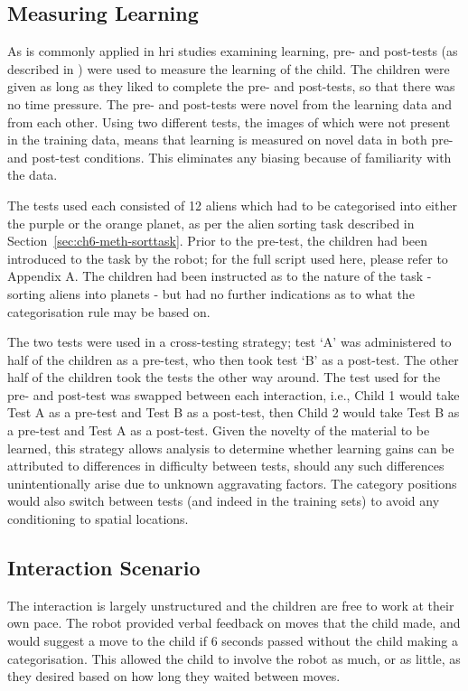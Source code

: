 \subsection{Measuring Learning}\label{sec:ch6-measure-learn}
As is commonly applied in \acrshort{hri} studies examining learning, pre- and post-tests (as described in \citealp{dimitrov2003pretest}) were used to measure the learning of the child. The children were given as long as they liked to complete the pre- and post-tests, so that there was no time pressure. The pre- and post-tests were novel from the learning data and from each other. Using two different tests, the images of which were not present in the training data, means that learning is measured on novel data in both pre- and post-test conditions. This eliminates any biasing because of familiarity with the data.

The tests used each consisted of 12 aliens which had to be categorised into either the purple or the orange planet, as per the alien sorting task described in Section~\ref{sec:ch6-meth-sorttask}. Prior to the pre-test, the children had been introduced to the task by the robot; for the full script used here, please refer to Appendix A. The children had been instructed as to the nature of the task - sorting aliens into planets - but had no further indications as to what the categorisation rule may be based on.

The two tests were used in a cross-testing strategy; test `A' was administered to half of the children as a pre-test, who then took test `B' as a post-test. The other half of the children took the tests the other way around. The test used for the pre- and post-test was swapped between each interaction, i.e., Child 1 would take Test A as a pre-test and Test B as a post-test, then Child 2 would take Test B as a pre-test and Test A as a post-test. Given the novelty of the material to be learned, this strategy allows analysis to determine whether learning gains can be attributed to differences in difficulty between tests, should any such differences unintentionally arise due to unknown aggravating factors. The category positions would also switch between tests (and indeed in the training sets) to avoid any conditioning to spatial locations.

\subsection{Interaction Scenario} \label{sec:ch6-meth-intscen}
The interaction is largely unstructured and the children are free to work at their own pace. The robot provided verbal feedback on moves that the child made, and would suggest a move to the child if 6 seconds passed without the child making a categorisation. This allowed the child to involve the robot as much, or as little, as they desired based on how long they waited between moves.

